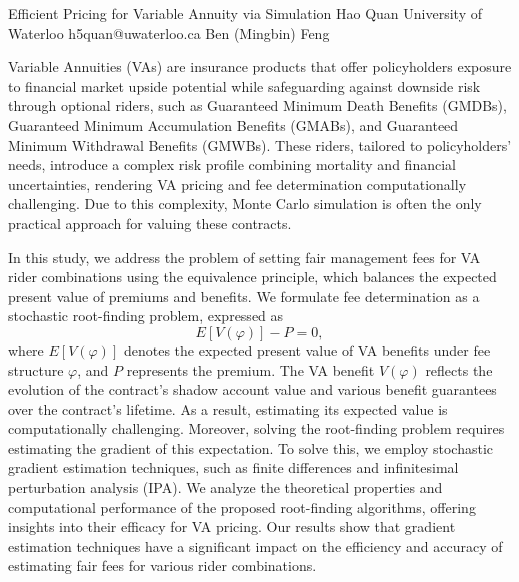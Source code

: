 \begin{talk}
\end{talk}

\begin{talk}
  {Efficient Pricing for Variable Annuity via Simulation}%
  {Hao Quan}%
  {University of Waterloo}%
  {h5quan@uwaterloo.ca}%
  {Ben (Mingbin) Feng}%
  
    

Variable Annuities (VAs) are insurance products that offer policyholders exposure to financial market upside potential while safeguarding against downside risk through optional riders, such as Guaranteed Minimum Death Benefits (GMDBs), Guaranteed Minimum Accumulation Benefits (GMABs), and Guaranteed Minimum Withdrawal Benefits (GMWBs). These riders, tailored to policyholders’ needs, introduce a complex risk profile combining mortality and financial uncertainties, rendering VA pricing and fee determination computationally challenging. Due to this complexity, Monte Carlo simulation is often the only practical approach for valuing these contracts.

In this study, we address the problem of setting fair management fees for VA rider combinations using the equivalence principle, which balances the expected present value of premiums and benefits. We formulate fee determination as a stochastic root-finding problem, expressed as
\[
E[V(\varphi)] - P = 0,
\]
where \( E[V(\varphi)] \) denotes the expected present value of VA benefits under fee structure \( \varphi \), and \( P \) represents the premium. The VA benefit \( V(\varphi) \) reflects the evolution of the contract’s shadow account value and various benefit guarantees over the contract’s lifetime. As a result, estimating its expected value is computationally challenging. Moreover, solving the root-finding problem requires estimating the gradient of this expectation. To solve this, we employ stochastic gradient estimation techniques, such as finite differences and infinitesimal perturbation analysis (IPA). We analyze the theoretical properties and computational performance of the proposed root-finding algorithms, offering insights into their efficacy for VA pricing. Our results show that gradient estimation techniques have a significant impact on the efficiency and accuracy of estimating fair fees for various rider combinations.
\end{talk}
